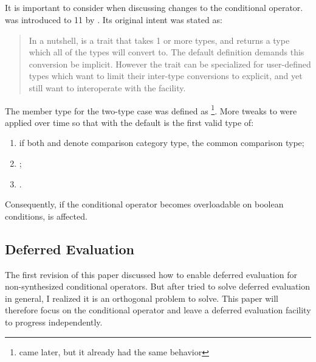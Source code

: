 \subsection{}\label{sec:common_type intro}
It is important to consider  when discussing changes to the conditional operator.
 was introduced to \CC{}11 by \textcite{N2661}.
Its original intent was stated as:
\begin{quote}{}
  In a nutshell,  is a trait that takes 1 or more types, and returns a type which all of the types will convert to.
  The default definition demands this conversion be implicit.
  However the trait can be specialized for user-defined types which want to limit their inter-type conversions to explicit, and yet still want to interoperate with the  facility.
\end{quote}
The member type  for the two-type case was defined as \footnote{ came later, but it already had the same behavior}.
More tweaks to  were applied over time so that with \cite{N4842} the default  is the first valid type of:
\begin{enumerate}
  \item if both  and  denote comparison category type, the common comparison type;
  \item {};
  \item {}.
\end{enumerate}
Consequently, if the conditional operator becomes overloadable on boolean conditions,  is affected.

\subsection{Deferred Evaluation}
The first revision of this paper discussed how to enable deferred evaluation for non-synthesized conditional operators.
But after \textcite{P0927R2} tried to solve deferred evaluation in general, I realized it is an orthogonal problem to solve.
This paper will therefore focus on the conditional operator and leave a deferred evaluation facility to progress independently.

